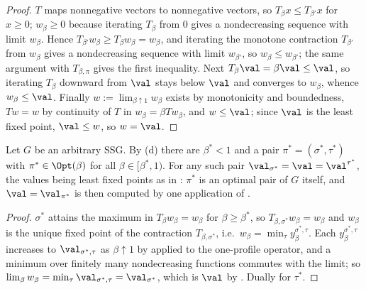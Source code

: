 \begin{proof}
$T$ maps nonnegative vectors to nonnegative vectors, so $T_\beta x\le
T_{\beta'}x$ for $x\ge0$; $w_\beta\ge0$ because iterating $T_\beta$ from $0$
gives a nondecreasing sequence with limit $w_\beta$. Hence
$T_{\beta'}w_\beta\ge T_\beta w_\beta=w_\beta$, and iterating the monotone
contraction $T_{\beta'}$ from $w_\beta$ gives a nondecreasing sequence with
limit $w_{\beta'}$, so $w_\beta\le w_{\beta'}$; the same argument with
$T_{\beta,\pi}$ gives the first inequality. Next $T_\beta\val=\beta\val\le\val$,
so iterating $T_\beta$ downward from $\val$ stays below $\val$ and converges to
$w_\beta$, whence $w_\beta\le\val$. Finally $w:=\lim_{\beta\uparrow1}w_\beta$
exists by monotonicity and boundedness, $Tw=w$ by continuity of $T$ in
$w_\beta=\beta Tw_\beta$, and $w\le\val$; since $\val$ is the least fixed point,
$\val\le w$, so $w=\val$.
\end{proof}

\begin{corollary}\label{pp:pair}
Let $G$ be an arbitrary SSG. By (d) there are $\beta^{\ast}<1$
and a pair $\pi^{\ast}=(\sigma^{\ast},\tau^{\ast})$ with $\pi^{\ast}\in\Opt(\beta)$
for all $\beta\in[\beta^{\ast},1)$. For any such pair
$\val_{\sigma^{\ast}}=\val=\val^{\tau^{\ast}}$, the values being least fixed
points as in : $\pi^{\ast}$ is an optimal pair of $G$
itself, and $\val=\val_{\pi^{\ast}}$ is then computed by one application of
.
\end{corollary}

\begin{proof}
$\sigma^{\ast}$ attains the maximum in $T_\beta w_\beta=w_\beta$ for
$\beta\ge\beta^{\ast}$, so $T_{\beta,\sigma^{\ast}}w_\beta=w_\beta$ and
$w_\beta$ is the unique fixed point of the contraction
$T_{\beta,\sigma^{\ast}}$, i.e.\ $w_\beta=\min_\tau y^{\sigma^{\ast},\tau}_\beta$.
Each $y^{\sigma^{\ast},\tau}_\beta$ increases to $\val_{\sigma^{\ast},\tau}$ as
$\beta\uparrow1$ by  applied to the one-profile operator, and
a minimum over finitely many nondecreasing functions commutes with the limit;
so $\lim_\beta w_\beta=\min_\tau\val_{\sigma^{\ast},\tau}=\val_{\sigma^{\ast}}$,
which is $\val$ by . Dually for $\tau^{\ast}$.
\end{proof}

